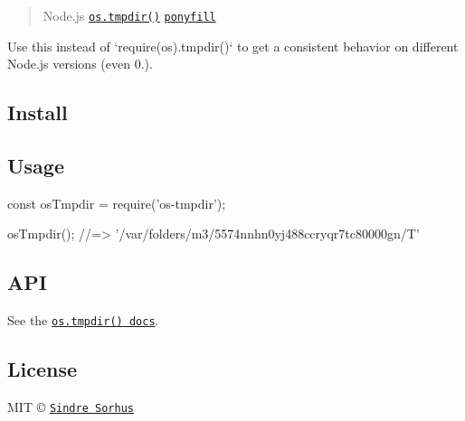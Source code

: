 \begin{quote}
Node.\+js \href{https://nodejs.org/api/os.html#os_os_tmpdir}{\tt {\ttfamily os.\+tmpdir()}} \href{https://ponyfill.com}{\tt ponyfill} \end{quote}


Use this instead of `require(\textquotesingle{}os\textquotesingle{}).tmpdir()` to get a consistent behavior on different Node.\+js versions (even 0.).

\subsection*{Install}




\subsection*{Usage}


\begin{DoxyCode}
const osTmpdir = require('os-tmpdir');

osTmpdir();
//=> '/var/folders/m3/5574nnhn0yj488ccryqr7tc80000gn/T'
\end{DoxyCode}


\subsection*{A\+PI}

See the \href{https://nodejs.org/api/os.html#os_os_tmpdir}{\tt {\ttfamily os.\+tmpdir()} docs}.

\subsection*{License}

M\+IT © \href{https://sindresorhus.com}{\tt Sindre Sorhus} 